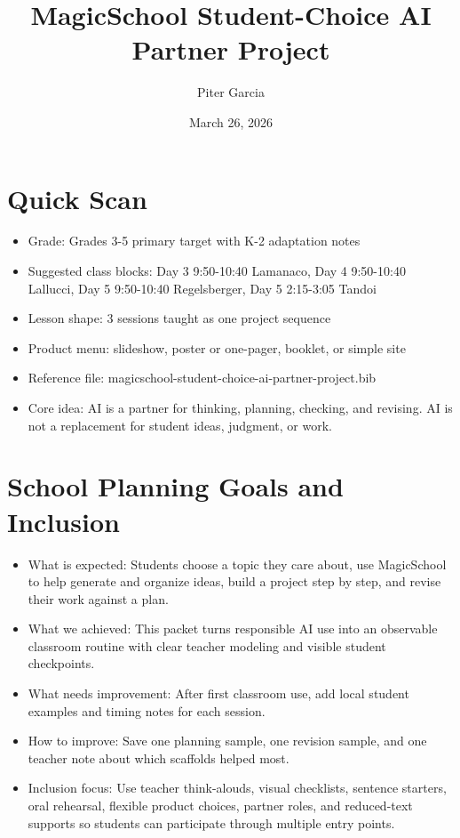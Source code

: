 \documentclass[11pt]{article}
\title{MagicSchool Student-Choice AI Partner Project}
\author{Piter Garcia}
\date{March 26, 2026}
\begin{document}
\maketitle

\section*{Quick Scan}
\begin{itemize}
\item Grade: Grades 3-5 primary target with K-2 adaptation notes
\item Suggested class blocks: Day 3 9:50-10:40 Lamanaco, Day 4 9:50-10:40 Lallucci, Day 5 9:50-10:40 Regelsberger, Day 5 2:15-3:05 Tandoi
\item Lesson shape: 3 sessions taught as one project sequence
\item Product menu: slideshow, poster or one-pager, booklet, or simple site
\item Reference file: magicschool-student-choice-ai-partner-project.bib
\item Core idea: AI is a partner for thinking, planning, checking, and revising. AI is not a replacement for student ideas, judgment, or work.
\end{itemize}

\section*{School Planning Goals and Inclusion}
\begin{itemize}
\item What is expected: Students choose a topic they care about, use MagicSchool to help generate and organize ideas, build a project step by step, and revise their work against a plan.
\item What we achieved: This packet turns responsible AI use into an observable classroom routine with clear teacher modeling and visible student checkpoints.
\item What needs improvement: After first classroom use, add local student examples and timing notes for each session.
\item How to improve: Save one planning sample, one revision sample, and one teacher note about which scaffolds helped most.
\item Inclusion focus: Use teacher think-alouds, visual checklists, sentence starters, oral rehearsal, flexible product choices, partner roles, and reduced-text supports so students can participate through multiple entry points.
\end{itemize}
\end{document}
